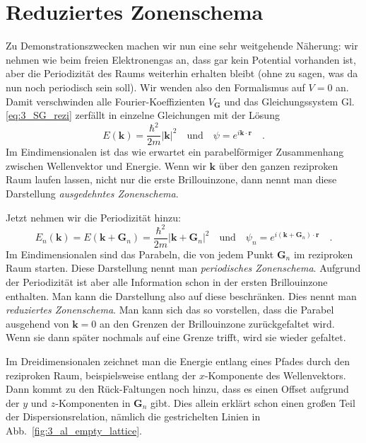 \section{Reduziertes Zonenschema}

Zu Demonstrationszwecken machen wir nun eine sehr weitgehende Näherung: wir nehmen wie beim freien Elektronengas an, dass gar kein Potential vorhanden ist, aber die Periodizität des Raums weiterhin erhalten bleibt (ohne zu sagen, was da nun noch periodisch sein soll). Wir wenden also den Formalismus auf $V=0$ an. Damit verschwinden alle Fourier-Koeffizienten $V_\mathbf{G}$ und das Gleichungssystem Gl. \ref{eq:3_SG_rezi} zerfällt in einzelne Gleichungen mit der Lösung
\begin{equation}
    E(\mathbf{k}) = \frac{\hbar^2}{2m} \left| \mathbf{k}  \right|^2 
    \quad \text{und} \quad 
    \psi = e^{i \mathbf{k} \cdot \mathbf{r}} \quad .
\end{equation}
Im Eindimensionalen ist das  wie erwartet ein parabelförmiger Zusammenhang zwischen Wellenvektor und Energie. Wenn wir $\mathbf{k}$ über den ganzen reziproken Raum laufen lassen, nicht nur die erste Brillouinzone, dann nennt man diese Darstellung \emph{ausgedehntes Zonenschema}.

Jetzt nehmen wir die Periodizität hinzu:
\begin{equation}
    E_n(\mathbf{k}) = E(\mathbf{k} + \mathbf{G}_n) 
     = \frac{\hbar^2}{2m} \left| \mathbf{k} + \mathbf{G}_n \right|^2 \quad \text{und} \quad \psi_n = e^{i (\mathbf{k} + \mathbf{G}_n) \cdot \mathbf{r}} \quad .
\end{equation}
Im Eindimensionalen sind das Parabeln, die von jedem Punkt  $\mathbf{G}_n $ im reziproken Raum starten. Diese Darstellung nennt man \emph{periodisches Zonenschema}. Aufgrund der Periodizität ist aber alle Information schon in der ersten Brillouinzone enthalten. Man kann die Darstellung also auf diese beschränken. Dies nennt man  \emph{reduziertes Zonenschema}. Man kann sich das so vorstellen, dass die Parabel ausgehend von  $\mathbf{k} = 0$  an den Grenzen der Brillouinzone zurückgefaltet wird. Wenn sie dann später nochmals auf eine Grenze trifft, wird sie wieder gefaltet.


Im Dreidimensionalen zeichnet man die Energie entlang eines Pfades durch den reziproken Raum, beispielsweise entlang der $x$-Komponente des Wellenvektors. Dann 
kommt zu den Rück-Faltungen noch hinzu, dass es einen Offset aufgrund der $y$ und $z$-Komponenten in $\mathbf{G}_n $ gibt. Dies allein erklärt schon einen großen Teil der Dispersionsrelation, nämlich die gestrichelten Linien in Abb.~\ref{fig:3_al_empty_lattice}.

